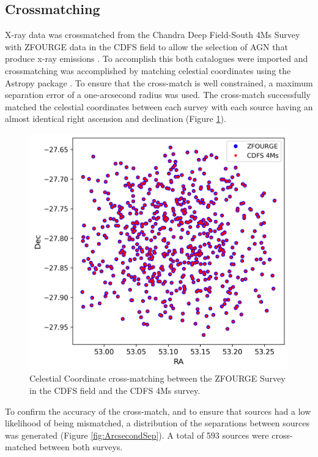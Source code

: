 \documentclass[11pt]{iopart}
\begin{document}
\subsection{Crossmatching}
X-ray data was crossmatched from the Chandra Deep Field-South 4Ms Survey \cite{xue_chandra_2011} with ZFOURGE data in the CDFS field to allow the selection of AGN that produce x-ray emissions \cite{szokoly_chandra_2004}. To accomplish this both catalogues were imported and crossmatching was accomplished by matching celestial coordinates using the Astropy package \cite{the_astropy_collaboration_astropy_2013}. To ensure that the cross-match is well constrained, a maximum separation error of a one-arcsecond radius was used. The cross-match successfully matched the celestial coordinates between each survey with each source having an almost identical right ascension and declination (Figure \ref{fig:Crossmatch}).
\begin{figure}[h]
  \centering
  \includegraphics[width=1\linewidth]{plots/CDFS_4Ms_Xray_ZFOURGE_XMatch.png}
  \caption{Celestial Coordinate cross-matching between the ZFOURGE Survey in the CDFS field and the CDFS 4Ms survey.}
  \label{fig:Crossmatch}
\end{figure}
To confirm the accuracy of the cross-match, and to ensure that sources had a low likelihood of being mismatched, a distribution of the separations between sources was generated (Figure \ref{fig:ArcsecondSep}). A total of 593 sources were cross-matched between both surveys. 
\end{document}
